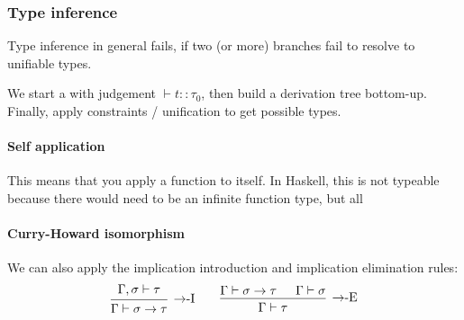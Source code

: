 \subsubsection{Type inference}
Type inference in general fails, if two (or more) branches fail to resolve to unifiable types.

We start a  with judgement $\vdash t :: \tau_0$, then build a derivation tree bottom-up.
Finally, apply constraints / unification to get possible types.


\paragraph{Self application}
This means that you apply a function to itself.
In Haskell, this is not typeable because there would need to be an infinite function type, but all 


\paragraph{Curry-Howard isomorphism}
We can also apply the implication introduction and implication elimination rules:
\[
    \begin{prooftree}
        \hypo{\Gamma, \sigma \vdash \tau}
        \infer1[$\rightarrow$-I]{\Gamma \vdash \sigma \rightarrow \tau}
    \end{prooftree}
    \qquad
    \begin{prooftree}
        \hypo{\Gamma \vdash \sigma \rightarrow \tau}
        \hypo{\Gamma \vdash \sigma}
        \infer2[$\rightarrow$-E]{\Gamma \vdash \tau}
    \end{prooftree}
\]
